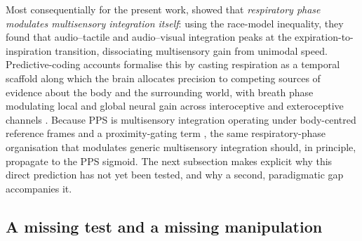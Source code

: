 Most consequentially for the present work, \citet{saltafossi_2025} showed that \emph{respiratory phase modulates multisensory integration itself}: using the race-model inequality, they found that audio--tactile and audio--visual integration peaks at the expiration-to-inspiration transition, dissociating multisensory gain from unimodal speed. Predictive-coding accounts formalise this by casting respiration as a temporal scaffold along which the brain allocates precision to competing sources of evidence about the body and the surrounding world, with breath phase modulating local and global neural gain across interoceptive and exteroceptive channels \citep{allen_2021, braendholt_2023, engelen_2023}. Because PPS is multisensory integration operating under body-centred reference frames and a proximity-gating term \citep{noel_2018, bertoni_2025, noel_2021}, the same respiratory-phase organisation that modulates generic multisensory integration should, in principle, propagate to the PPS sigmoid. The next subsection makes explicit why this direct prediction has not yet been tested, and why a second, paradigmatic gap accompanies it.

\subsection{A missing test and a missing manipulation}


